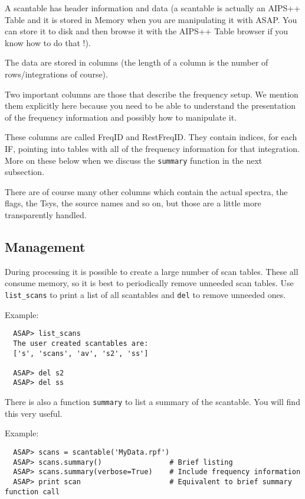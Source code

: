\documentclass[11pt]{article}
\newcommand{\cmd}[1]{{\tt #1}}
\begin{document}
A scantable has header information and data (a scantable is actually an AIPS++
Table and it is stored in Memory when you are manipulating it with ASAP.
You can store it to disk and then browse it with the AIPS++
Table browser if you know how to do that !).

The data are stored in columns (the length of a column is the number of
rows/integrations of course).  

Two important columns are those that describe the frequency setup.  We mention
them explicitly here because you need to be able to understand the presentation
of the frequency information and possibly how to manipulate it.

These columns are called FreqID and RestFreqID.  They contain indices, for
each IF, pointing into tables with all of the frequency information for that
integration.   More on these below when we discuss the \cmd{summary} function
in the next subsection.

There are of course many other columns which contain the actual spectra,
the flags, the Tsys, the source names and so on, but those are a little
more transparently handled.

\subsection{Management}

During processing it is possible to create a large number of scan
tables. These all consume memory, so it is best to periodically remove
unneeded scan tables. Use \cmd{list\_scans} to print a list of all
scantables and \cmd{del} to remove unneeded ones.

Example:

\begin{verbatim}
  ASAP> list_scans
  The user created scantables are:
  ['s', 'scans', 'av', 's2', 'ss']

  ASAP> del s2   
  ASAP> del ss
\end{verbatim}

There is also a function \cmd{summary} to list a summary of the scantable.
You will find this very useful.

Example:

\begin{verbatim}
  ASAP> scans = scantable('MyData.rpf')
  ASAP> scans.summary()                # Brief listing
  ASAP> scans.summary(verbose=True)    # Include frequency information
  ASAP> print scan                     # Equivalent to brief summary function call
\end{verbatim}
\end{document}

